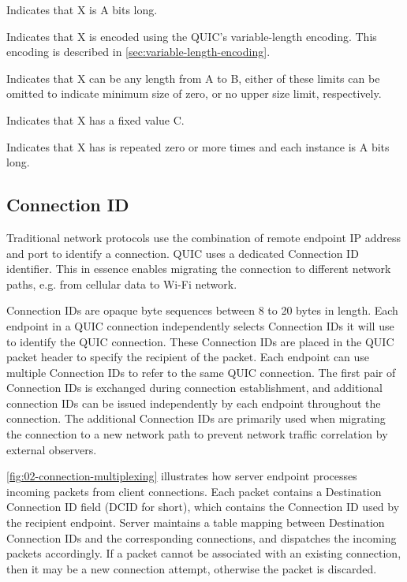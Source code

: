 \begin{itemize}

   Indicates that X is A bits long.

   Indicates that X is encoded using the QUIC's variable-length encoding. This encoding is described in \autoref{sec:variable-length-encoding}.

   Indicates that X can be any length from A to B, either of these limits can be omitted to indicate minimum size of zero, or no upper size limit, respectively.

   Indicates that X has a fixed value C.

   Indicates that X has is repeated zero or more times and each instance is A bits long.

\end{itemize}

\subsection{Connection ID}

Traditional network protocols use the combination of remote endpoint IP address and port to identify
a connection. QUIC uses a dedicated Connection ID identifier. This in essence enables migrating the
connection to different network paths, e.g. from cellular data to Wi-Fi network.

Connection IDs are opaque byte sequences between 8 to 20 bytes in length. Each endpoint in a QUIC
connection independently selects Connection IDs it will use to identify the QUIC connection. These
Connection IDs are placed in the QUIC packet header to specify the recipient of the packet. Each
endpoint can use multiple Connection IDs to refer to the same QUIC connection. The first pair of
Connection IDs is exchanged during connection establishment, and additional connection IDs can be
issued independently by each endpoint throughout the connection. The additional Connection IDs are
primarily used when migrating the connection to a new network path to prevent network traffic
correlation by external observers.

\autoref{fig:02-connection-multiplexing} illustrates how server endpoint processes incoming packets
from client connections. Each packet contains a Destination Connection ID field (DCID for short),
which contains the Connection ID used by the recipient endpoint. Server maintains a table mapping
between Destination Connection IDs and the corresponding connections, and dispatches the incoming
packets accordingly. If a packet cannot be associated with an existing connection, then it may be a
new connection attempt, otherwise the packet is discarded.

